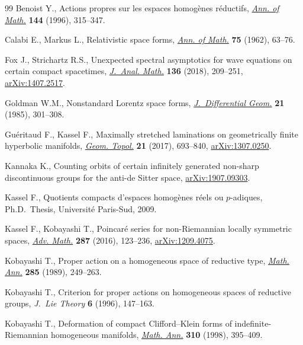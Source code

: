 \documentclass[11pt]{article}
\numberwithin{equation}{section}
\numberwithin{equation}{section}
\begin{document}
\begin{thebibliography}{99}
Benoist Y., Actions propres sur les espaces homog\`enes r\'eductifs,
 \href{https://doi.org/10.2307/2118594}{\textit{Ann. of Math.}} \textbf{144} (1996), 315--347.

Calabi E., Markus L., Relativistic space forms, \href{https://doi.org/10.2307/1970419}{\textit{Ann. of Math.}}
 \textbf{75} (1962), 63--76.

Fox J., Strichartz R.S., Unexpected spectral asymptotics for wave equations on
 certain compact spacetimes, \href{https://doi.org/10.1007/s11854-018-0059-2}{\textit{J.~Anal. Math.}} \textbf{136} (2018),
 209--251, \href{https://arxiv.org/abs/1407.2517}{arXiv:1407.2517}.

Goldman W.M., Nonstandard {L}orentz space forms, \href{https://doi.org/10.4310/jdg/1214439567}{\textit{J.~Differential Geom.}}
 \textbf{21} (1985), 301--308.

Gu\'eritaud F., Kassel F., Maximally stretched laminations on geometrically
 finite hyperbolic manifolds, \href{https://doi.org/10.2140/gt.2017.21.693}{\textit{Geom. Topol.}} \textbf{21} (2017),
 693--840, \href{https://arxiv.org/abs/1307.0250}{arXiv:1307.0250}.

Kannaka K., Counting orbits of certain infinitely generated non-sharp
 discontinuous groups for the anti-de {S}itter space, \href{https://arxiv.org/abs/1907.09303}{arXiv:1907.09303}.

Kassel F., Quotients compacts d'espaces homog\`enes r\'eels ou $p$-adiques,
 Ph.D.~Thesis, {U}niversit\'e Paris-Sud, 2009.

Kassel F., Kobayashi T., Poincar\'e series for non-{R}iemannian locally
 symmetric spaces, \href{https://doi.org/10.1016/j.aim.2015.08.029}{\textit{Adv. Math.}} \textbf{287} (2016), 123--236,
 \href{https://arxiv.org/abs/1209.4075}{arXiv:1209.4075}.

Kobayashi T., Proper action on a homogeneous space of reductive type,
 \href{https://doi.org/10.1007/BF01443517}{\textit{Math. Ann.}} \textbf{285} (1989), 249--263.

Kobayashi T., Criterion for proper actions on homogeneous spaces of reductive
 groups, \textit{J.~Lie Theory} \textbf{6} (1996), 147--163.

Kobayashi T., Deformation of compact {C}lifford--{K}lein forms of
 indefinite-{R}iemannian homogeneous manifolds, \href{https://doi.org/10.1007/s002080050153}{\textit{Math. Ann.}}
 \textbf{310} (1998), 395--409.


\end{thebibliography}
\end{document}
